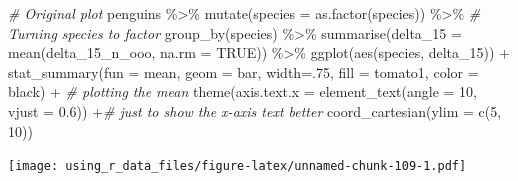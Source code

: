 \documentclass[
]{book}
\newenvironment{Shaded}{\begin{snugshade}}{\end{snugshade}}
\newcommand{\AttributeTok}[1]{\textcolor[rgb]{0.77,0.63,0.00}{#1}}
\newcommand{\CommentTok}[1]{\textcolor[rgb]{0.56,0.35,0.01}{\textit{#1}}}
\newcommand{\ConstantTok}[1]{\textcolor[rgb]{0.00,0.00,0.00}{#1}}
\newcommand{\DecValTok}[1]{\textcolor[rgb]{0.00,0.00,0.81}{#1}}
\newcommand{\FloatTok}[1]{\textcolor[rgb]{0.00,0.00,0.81}{#1}}
\newcommand{\FunctionTok}[1]{\textcolor[rgb]{0.00,0.00,0.00}{#1}}
\newcommand{\NormalTok}[1]{#1}
\newcommand{\SpecialCharTok}[1]{\textcolor[rgb]{0.00,0.00,0.00}{#1}}
\newcommand{\StringTok}[1]{\textcolor[rgb]{0.31,0.60,0.02}{#1}}
\begin{document}
\begin{Shaded}
\begin{Highlighting}[]
\CommentTok{\# Original plot}
\NormalTok{penguins }\SpecialCharTok{\%\textgreater{}\%} 
  \FunctionTok{mutate}\NormalTok{(}\AttributeTok{species =} \FunctionTok{as.factor}\NormalTok{(species)) }\SpecialCharTok{\%\textgreater{}\%}  \CommentTok{\# Turning species to factor}
  \FunctionTok{group\_by}\NormalTok{(species) }\SpecialCharTok{\%\textgreater{}\%} 
  \FunctionTok{summarise}\NormalTok{(}\AttributeTok{delta\_15 =} \FunctionTok{mean}\NormalTok{(delta\_15\_n\_ooo, }\AttributeTok{na.rm =} \ConstantTok{TRUE}\NormalTok{)) }\SpecialCharTok{\%\textgreater{}\%} 
  \FunctionTok{ggplot}\NormalTok{(}\FunctionTok{aes}\NormalTok{(species, delta\_15)) }\SpecialCharTok{+}
  \FunctionTok{stat\_summary}\NormalTok{(}\AttributeTok{fun =}\NormalTok{ mean, }\AttributeTok{geom =} \StringTok{\textquotesingle{}bar\textquotesingle{}}\NormalTok{, }\AttributeTok{width=}\NormalTok{.}\DecValTok{75}\NormalTok{, }\AttributeTok{fill =} \StringTok{\textquotesingle{}tomato1\textquotesingle{}}\NormalTok{, }\AttributeTok{color =} \StringTok{\textquotesingle{}black\textquotesingle{}}\NormalTok{) }\SpecialCharTok{+}  \CommentTok{\# plotting the mean}
  \FunctionTok{theme}\NormalTok{(}\AttributeTok{axis.text.x =} \FunctionTok{element\_text}\NormalTok{(}\AttributeTok{angle =} \DecValTok{10}\NormalTok{, }\AttributeTok{vjust =} \FloatTok{0.6}\NormalTok{)) }\SpecialCharTok{+}\CommentTok{\# just to show the x{-}axis text better}
  \FunctionTok{coord\_cartesian}\NormalTok{(}\AttributeTok{ylim =} \FunctionTok{c}\NormalTok{(}\DecValTok{5}\NormalTok{, }\DecValTok{10}\NormalTok{))}
\end{Highlighting}
\end{Shaded}

\texttt{[image: using\_r\_data\_files/figure-latex/unnamed-chunk-109-1.pdf]}
\end{document}
